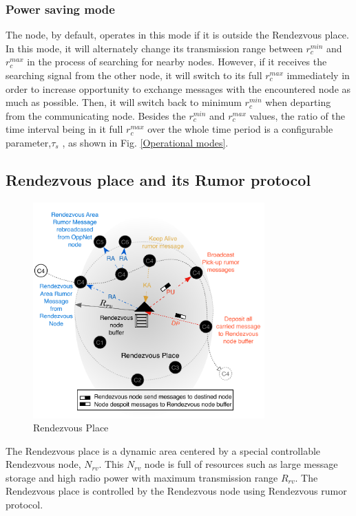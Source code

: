 \subsubsection{Power saving mode}
The node, by default, operates in this mode if it is outside the Rendezvous place.
In this mode, it will alternately change its transmission range between ${ r }_{ c }^{ min }$ and ${ r }_{ c }^{ max }$ in the process of searching for nearby nodes.
However, if it receives the searching signal from the other node, it will switch to its full ${ r }_{ c }^{ max }$ immediately in order to increase opportunity to exchange messages with the encountered node as much as possible.
Then, it will switch back to minimum ${ r }_{ c }^{ min }$ when departing from the communicating node.
Besides the ${ r }_{ c }^{ min }$ and ${ r }_{ c }^{ max }$ values, the ratio of the time interval being in it full ${ r }_{ c }^{ max }$ over the whole time period is a configurable parameter,$\tau_{s}$ , as shown in Fig. \ref{Operational modes}.

\subsection{Rendezvous place and its Rumor protocol}
\label{DRRA:Rendezvous place and its Rumor protocol}

\begin{figure}[!t]
	\centering
	\includegraphics[width=3.5in]{Figures/NewRendezvousPlace.pdf}
	\caption{Rendezvous Place}
	\label{Rendezvous Place}
\end{figure}

The Rendezvous place is a dynamic area centered by a special controllable Rendezvous node, $N_{rv}$.
This $N_{rv}$ node is full of resources such as large message storage and high radio power with maximum transmission range $R_{rv}$.
The Rendezvous place is controlled by the Rendezvous node using Rendezvous rumor protocol.

